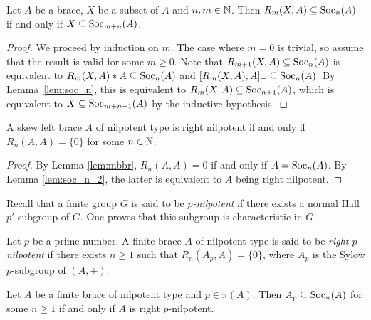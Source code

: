 \begin{lemma}
\label{lem:mbbr}
	Let $A$ be a brace, $X$ be a subset of $A$ and $n,m\in\mathbb{N}$.
	Then $R_m(X,A)\subseteq \operatorname{Soc}_n(A)$ 
	if and only if $X\subseteq\operatorname{Soc}_{m+n}(A)$.
\end{lemma}

\begin{proof}
    We proceed by induction on $m$. The case where $m=0$ is trivial, so assume that the result is valid for some $m\geq0$. 
	Note that $R_{m+1}(X,A)\subseteq\operatorname{Soc}_{n}(A)$ is equivalent to  $R_m(X,A)*A\subseteq\operatorname{Soc}_{n}(A)$ and $[R_m(X,A),A]_+ \subseteq\operatorname{Soc}_{n}(A)$. 
	By Lemma~\ref{lem:soc_n}, this is equivalent to $R_m(X,A)\subseteq\operatorname{Soc}_{n+1}(A)$, 
	which is equivalent to $X\subseteq\operatorname{Soc}_{m+n+1}(A)$ by the inductive hypothesis.
\end{proof}

\begin{lemma}
	A skew left brace $A$ of nilpotent type is right nilpotent if and only if $R_n(A,A)=\{0\}$ for some $n\in\mathbb{N}$.
%	
\end{lemma}

\begin{proof}
    By Lemma \ref{lem:mbbr}, $R_n(A,A)=0$ if and only if $A=\operatorname{Soc}_{n}(A)$. By Lemma \ref{lem:soc_n_2}, 
    the latter is equivalent to $A$ being right nilpotent.
\end{proof}

Recall that a finite group $G$ is said to be \emph{$p$-nilpotent} if there exists 
a normal Hall $p'$-subgroup of $G$. One proves that this subgroup is characteristic in $G$. 

\begin{definition}
    Let $p$ be a prime number. A finite brace $A$ of nilpotent type 
    is said to be \emph{right $p$-nilpotent} if there 
    exists $n\geq1$ such that $R_n(A_p,A)=\{0\}$, where $A_p$ is the Sylow $p$-subgroup of $(A,+)$.
\end{definition}

\begin{proposition}
\label{pro:soc_n}
    Let $A$ be a finite brace of nilpotent type and $p\in\pi(A)$. Then
    $A_p\subseteq\operatorname{Soc}_n(A)$ for some $n\geq1$ if and only if 
    $A$ is right $p$-nilpotent. 
\end{proposition}

